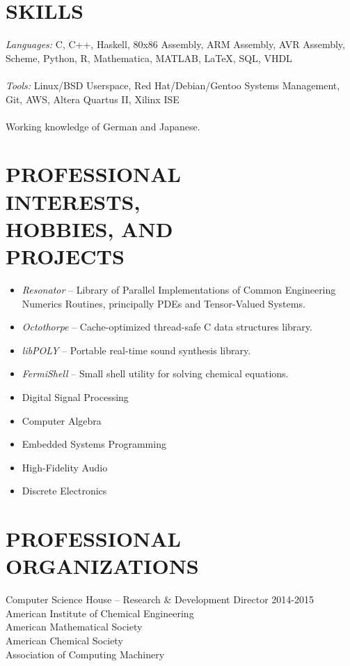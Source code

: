 \documentclass[line,margin]{res}
\begin{document}
\begin{resume}
\section{SKILLS} {\sl Languages:} C, C++, Haskell, 80x86 Assembly, ARM Assembly, AVR Assembly, Scheme, Python, R, Mathematica, MATLAB, \LaTeX, SQL, VHDL \\ \\
                 {\sl Tools:} Linux/BSD Userspace, Red Hat/Debian/Gentoo Systems Management, Git, AWS, Altera Quartus II, Xilinx ISE \\ \\
                 Working knowledge of German and Japanese.


\section{PROFESSIONAL \\ INTERESTS, \\ HOBBIES, AND \\ PROJECTS}
				\begin{itemize} \itemsep -2pt
				\item	\emph{Resonator} -- Library of Parallel Implementations of Common Engineering Numerics Routines, principally PDEs and Tensor-Valued Systems.
				\item	\emph{Octothorpe} -- Cache-optimized thread-safe C data structures library.
				\item	\emph{libPOLY} -- Portable real-time sound synthesis library.
				\item	\emph{FermiShell} -- Small shell utility for solving chemical equations.
				\item	Digital Signal Processing
				\item	Computer Algebra
				\item	Embedded Systems Programming
				\item	High-Fidelity Audio
				\item	Discrete Electronics
				\end{itemize}

\section{PROFESSIONAL ORGANIZATIONS}
Computer Science House -- Research \& Development Director 2014-2015\\
American Institute of Chemical Engineering\\
American Mathematical Society\\
American Chemical Society\\
Association of Computing Machinery\\

\end{resume}
\end{document}
